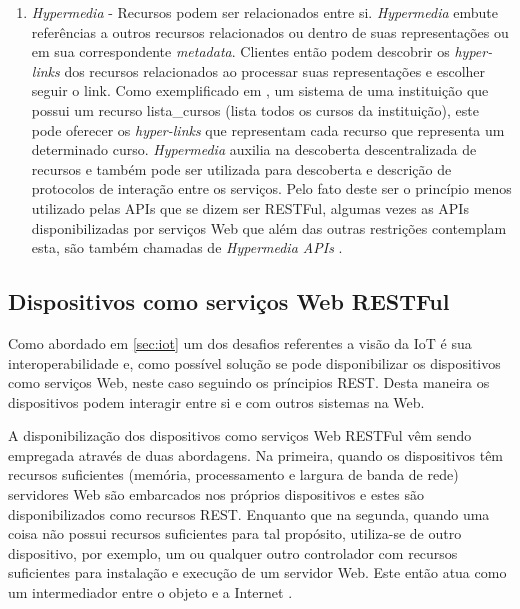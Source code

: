 \begin{enumerate}
\item \textit{Hypermedia} - Recursos podem ser relacionados entre si. \textit{Hypermedia} embute referências a outros recursos relacionados ou dentro de suas representações ou em sua correspondente \textit{metadata}. Clientes então podem descobrir os \textit{hyper-links} dos recursos relacionados ao processar suas representações e escolher seguir o link. Como exemplificado em \cite{Franca:2011}, um sistema de uma instituição que possui um recurso lista\_cursos (lista todos os cursos da instituição), este pode oferecer os \textit{hyper-links} que representam cada recurso que representa um determinado curso. \textit{Hypermedia} auxilia na descoberta descentralizada de recursos e também pode ser utilizada para descoberta e descrição de protocolos de interação entre os serviços. Pelo fato deste ser o princípio menos utilizado pelas APIs que se dizem ser RESTFul, algumas vezes as APIs disponibilizadas por serviços Web que além das outras restrições contemplam esta, são também chamadas de \textit{Hypermedia APIs} \cite{Pautasso:2014}.
\end{enumerate}

\subsection{Dispositivos como serviços Web RESTFul} 
\label{subsec:dispositivosWeb}
Como abordado em \ref{sec:iot} um dos desafios referentes a visão da IoT é sua interoperabilidade e, como possível solução se pode disponibilizar os dispositivos como serviços Web, neste caso seguindo os príncipios REST. Desta maneira os dispositivos podem interagir entre si e com outros sistemas na Web.

A disponibilização dos dispositivos como serviços Web RESTFul vêm sendo empregada através de duas abordagens. Na primeira, quando os dispositivos têm recursos suficientes (memória, processamento e largura de banda de rede) servidores Web são embarcados nos próprios dispositivos e estes são disponibilizados como recursos REST. Enquanto que na segunda, quando uma coisa não possui recursos suficientes para tal propósito, utiliza-se de outro dispositivo, por exemplo, um  ou qualquer outro controlador com recursos suficientes para instalação e execução de um servidor Web. Este então atua como um intermediador entre o objeto e a Internet \cite{Franca:2011}.

